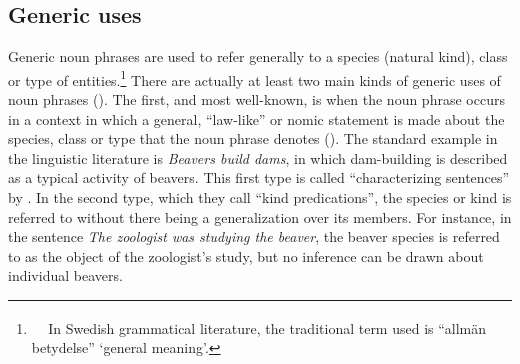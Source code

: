 \subsection{\rmfamily Generic uses}
\label{bkm:Ref105226591}\label{bkm:Ref154983693}
\begin{styleBodyTextFirst}
Generic noun phrases are used to refer generally to a species (natural kind), class or type of entities.\footnote{\textsuperscript{\ \ } In Swedish grammatical literature, the traditional term used is “allmän betydelse” ‘general meaning’.} There are actually at least two main kinds of generic uses of noun phrases (\citet[19]{KrifkaEtAl1995}). The first, and most well-known, is when the noun phrase occurs in a context in which a general, “law-like” or nomic statement is made about the species, class or type that the noun phrase denotes (\citet{Dahl1973}). The\textbf{ }standard example in the linguistic literature is \textit{Beavers build dams}, in which dam-building is described as a typical activity of beavers. This first type is called “characterizing sentences” by \citet{KrifkaEtAl1995}. In the second type, which they call “kind predications”, the species or kind is referred to without there being a generalization over its members. For instance, in the sentence \textit{The zoologist was studying the beaver}, the beaver species is referred to as the object of the zoologist’s study, but no inference can be drawn about individual beavers.

\end{styleBodyTextFirst}

